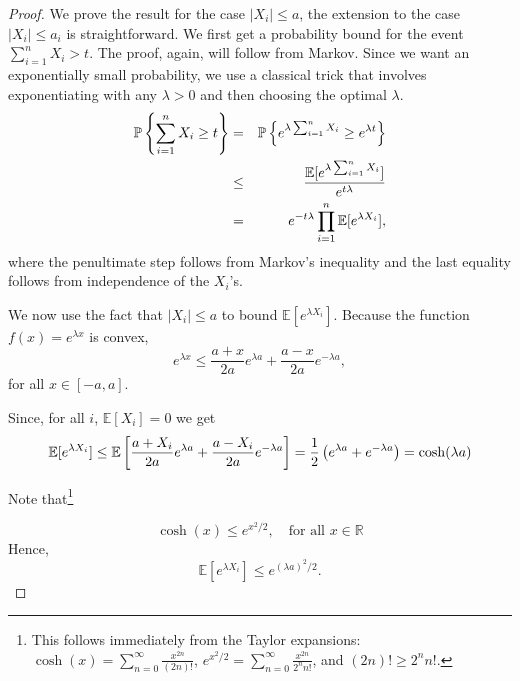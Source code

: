\begin{proof}
We prove the result for the case $|X_i| \le a$, the extension to the case $|X_i| \leq a_i$ is straightforward.
We first get a probability bound for the event $\sum_{i=1}^n X_i > t$. The proof, again, will follow from Markov. Since we want an exponentially small probability, we use a classical trick that involves exponentiating with any $\lambda>0$ and then choosing the optimal $\lambda$.
\begin{eqnarray}
\Prob\left\{ \sum_{i=1}^n X_i \geq t \right\} %
&=&  \Prob\left\{e^{\lambda\sum_{i=1}^n X_i} \geq e^{\lambda  t} \right\} \nonumber \\
&\leq & \frac{\mathbb{E}[e^{\lambda\sum_{i=1}^n X_i}]}{e^{ t\lambda}} \nonumber \\
&=& e^{- t \lambda} \prod_{i=1}^n \mathbb{E}[e^{\lambda X_i}], \label{eq:4:WhereBernsteinIsGoingToImprove}\label{eq:4:Hof}
\end{eqnarray}
where the penultimate step follows from Markov's inequality and the last equality follows from independence of the $X_i$'s.

We now use the fact that $|X_i|\leq a$ to bound $\mathbb{E}[e^{\lambda X_i}]$. Because the function $f(x) = e^{ \lambda x}$ is convex,
\begin{equation*}
e^{\lambda x} \leq \frac{a+x}{2a}e^{\lambda a} + \frac{a-x}{2a}e^{-\lambda a},
\end{equation*}
for all $x\in[-a,a]$.

Since, for all $i$, $\mathbb{E}[X_i]=0$ we get
\begin{equation*}
\mathbb{E}[e^{\lambda X_i}] \leq \mathbb{E}\left[ \frac{a+X_i}{2a}e^{\lambda a} + \frac{a-X_i}{2a}e^{-\lambda a} \right] = \frac{1}{2}\left(e^{\lambda a} + e^{- \lambda a} \right) = \cosh (\lambda a)
\end{equation*}

Note that\footnote{This follows immediately from the Taylor expansions:
$\cosh(x) = \sum_{n=0}^\infty \frac{x^{2n}}{(2n)!}$,
$e^{x^2/2} = \sum_{n=0}^\infty \frac{x^{2n}}{2^n n!}$, and $(2n)! \geq 2^n n!$. }

$$\cosh(x) \leq e^{x^2/2}, \quad \text{for all } x\in \mathbb{R}$$
Hence,
\begin{equation}\label{eq:boundedimpliessubgaussian}
\mathbb{E}[e^{\lambda X_i}]  \leq e^{(\lambda a)^2/2}.
\end{equation}


\end{proof}
